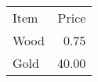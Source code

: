 \documentclass{standalone}
\begin{document}
\begin{comment}
\begin{tabular}{
		@{} %
		lr
		@{} %
	} 
	Item & Price \\ 
	...

	Wood & 0.75 \\
	Gold & 40.00   \\
\end{tabular}
\end{comment}

\begin{tabular}{
		@{} %
		lr
		@{} %
	} 
	Item & Price \\ 
	\cmidrule(r){1-1}

	Wood & 0.75 \\
	Gold & 40.00   \\
\end{tabular}
\end{document}
